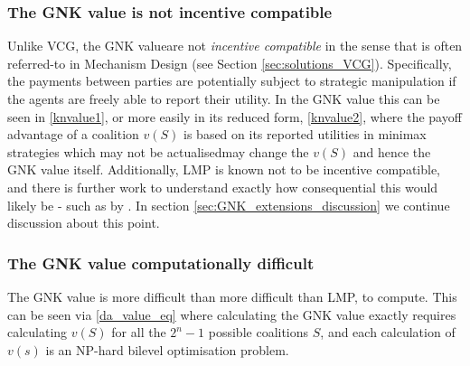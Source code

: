 \subsubsection*{The GNK value is not incentive compatible}
Unlike VCG, the GNK value\DIFdelbegin {}\DIFdelend \DIFaddbegin {}\DIFaddend are not \emph{incentive compatible} in the sense that is often referred-to in Mechanism Design (see Section \ref{sec:solutions_VCG}).
Specifically, the payments between parties are potentially subject to strategic manipulation if the agents are freely able to report their utility.
In the GNK value this can be seen in \eqref{knvalue1}, or more easily in its reduced form, \eqref{knvalue2}, where the payoff advantage of a coalition $v(S)$ is based on its reported utilities in minimax strategies which may not be actualised\DIFdelbegin {}\DIFdelend \DIFaddbegin {}\DIFaddend may change the $v(S)$ and hence the GNK value itself.
Additionally, LMP is known not to be incentive compatible, and there is further work to understand exactly how consequential this would likely be - such as by \cite{8054716}.
In section \ref{sec:GNK_extensions_discussion} we continue discussion about this point.

\subsubsection*{The GNK value \DIFdelbegin {}\DIFdelend \DIFaddbegin {}\DIFaddend computationally difficult}
The GNK value is more difficult than \DIFdelbegin {}\DIFdelend \DIFaddbegin {}\DIFaddend more difficult than LMP, to compute.
This can be seen via \eqref{da_value_eq} where calculating the GNK value exactly requires calculating $v(S)$ for all the $2^n-1$ possible coalitions $S$, and each calculation of $v(s)$ is an NP-hard bilevel optimisation problem.
\DIFdelbegin {}\DIFdelend \DIFaddbegin {}

